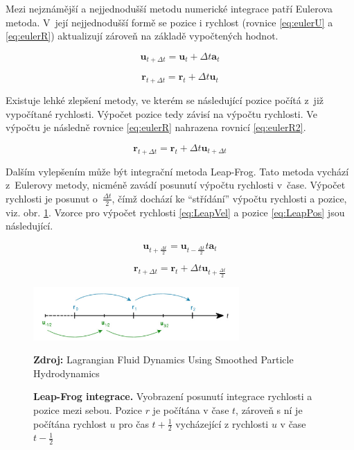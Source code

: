 Mezi nejznámější a nejjednodušší metodu numerické integrace patří Eulerova metoda. V~její nejjednodušší formě se pozice i rychlost (rovnice \ref{eq:eulerU} a \ref{eq:eulerR}) aktualizují zároveň na základě vypočtených hodnot.

\begin{equation}
	\mathbf{u}_{t + \Delta t} = \mathbf{u}_t + \Delta t \mathbf{a}_t
	\label{eq:eulerU}
\end{equation}

\begin{equation}
	\mathbf{r}_{t + \Delta t} = \mathbf{r}_t + \Delta t \mathbf{u}_t
	\label{eq:eulerR}
\end{equation}

Existuje lehké zlepšení metody, ve kterém se následující pozice počítá z~již vypočítané rychlosti. Výpočet pozice tedy závisí na výpočtu rychlosti. Ve výpočtu je následně rovnice \ref{eq:eulerR} nahrazena rovnicí \ref{eq:eulerR2}. \cite{KelagerSPH}

\begin{equation}
	\mathbf{r}_{t + \Delta t} = \mathbf{r}_t + \Delta t \mathbf{u}_{t + \Delta t}
	\label{eq:eulerR2}
\end{equation}

Dalším vylepšením může být integrační metoda Leap-Frog. Tato metoda vychází z~Eulerovy metody, nicméně zavádí posunutí výpočtu rychlosti v~čase. Výpočet rychlosti je posunut o~$\frac{\Delta t}{2}$, čímž dochází ke \enquote{střídání} výpočtu rychlosti a pozice, viz. obr. \ref{fig:LeapFrog}. Vzorce pro výpočet rychlosti \ref{eq:LeapVel} a pozice \ref{eq:LeapPos} jsou následující.

\begin{equation}
	\mathbf{u}_{t + \frac{\Delta t}{2}} = \mathbf{u}_{t - \frac{\Delta t}{2}} t \mathbf{a}_t
	\label{eq:LeapVel}
\end{equation}

\begin{equation}
	\mathbf{r}_{t + \Delta t} = \mathbf{r}_t + \Delta t \mathbf{u}_{t + \frac{\Delta t}{2}}
	\label{eq:LeapPos}
\end{equation}

\begin{figure}[hbt]
	\centering
	\captionsetup{justification=centering}
	\includegraphics[width=0.7\textwidth]{obrazky-figures/leapFrog.PNG}
	\caption{\textbf{Leap-Frog integrace.} Vyobrazení posunutí integrace rychlosti a pozice mezi sebou. Pozice $r$ je počítána v čase $t$, zároveň s ní je počítána rychlost $u$ pro čas $t+\frac{1}{2}$ vycházející z rychlosti $u$ v čase $t-\frac{1}{2}$}
	\textbf{Zdroj: } Lagrangian Fluid Dynamics Using Smoothed Particle Hydrodynamics \cite{KelagerSPH}
	\label{fig:LeapFrog}
\end{figure}

